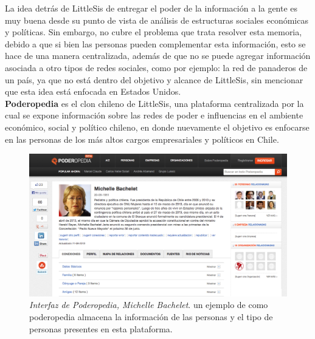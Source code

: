 La idea detrás de LittleSis de entregar el poder de la información a la gente es muy buena desde su punto de vista de análisis de estructuras sociales económicas y políticas. Sin embargo, no cubre el problema que trata resolver esta memoria, debido a que si bien las personas pueden complementar esta información, esto se hace de una manera centralizada, además de que no se puede agregar información asociada a otro tipos de redes sociales, como por ejemplo: la red de panaderos de un país, ya que no está dentro del objetivo y alcance de LittleSis, sin mencionar que esta idea está enfocada en Estados Unidos.\\

\textbf{Poderopedia} es el clon chileno de LittleSis, una plataforma centralizada por la cual se expone información sobre las redes de poder e influencias en el ambiente económico, social y político chileno, en donde nuevamente el objetivo es enfocarse en las personas de los más altos cargos empresariales y políticos en Chile.\\

\begin{figure}[H]
  \includegraphics[width=1.0\textwidth]{images/poderopedia.png}
  \caption[Interfaz de Poderopedia, Michelle Bachelet]{\emph{Interfaz de Poderopedia, Michelle Bachelet}. un ejemplo de como poderopedia almacena la información de las personas y el tipo de personas presentes en esta plataforma.}
  \label{ejemplo_poderopedia}
\end{figure}

